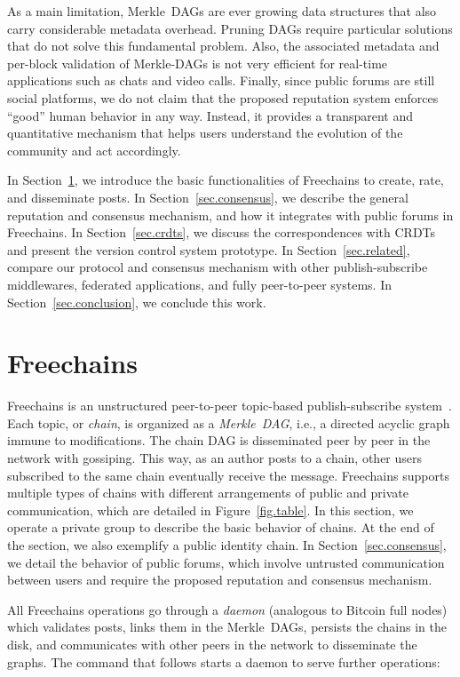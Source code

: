 \documentclass[10pt,journal,compsoc]{IEEEtran}
\newcommand{\FC}       {Freechains\xspace}
\begin{document}
As a main limitation, Merkle~DAGs are ever growing data structures that also
carry considerable metadata overhead.
Pruning DAGs require particular solutions that do not solve this fundamental
problem.
%
Also, the associated metadata and per-block validation of Merkle-DAGs is not
very efficient for real-time applications such as chats and video calls.
%
Finally, since public forums are still social platforms, we do not claim that
the proposed reputation system enforces ``good'' human behavior in any way.
Instead, it provides a transparent and quantitative mechanism that helps users
understand the evolution of the community and act accordingly.

In Section~\ref{sec.freechains}, we introduce the basic functionalities of \FC
to create, rate, and disseminate posts.
In Section~\ref{sec.consensus}, we describe the general reputation and
consensus mechanism, and how it integrates with public forums in \FC.
In Section~\ref{sec.crdts}, we discuss the correspondences with CRDTs and
present the version control system prototype.
In Section~\ref{sec.related}, compare our protocol and consensus mechanism with
other publish-subscribe middlewares, federated applications, and fully
peer-to-peer systems.
In Section~\ref{sec.conclusion}, we conclude this work.

\section{Freechains}
\label{sec.freechains}

\FC is an unstructured peer-to-peer topic-based publish-subscribe
system~\cite{fcs.sbseg20}.
Each topic, or \emph{chain}, is organized as a \emph{Merkle~DAG}, i.e., a
directed acyclic graph immune to modifications.
The chain DAG is disseminated peer by peer in the network with gossiping.
This way, as an author posts to a chain, other users subscribed to the same
chain eventually receive the message.
\FC supports multiple types of chains with different arrangements of public and
private communication, which are detailed in Figure~\ref{fig.table}.
In this section, we operate a private group to describe the basic behavior of
chains.
At the end of the section, we also exemplify a public identity chain.
In Section~\ref{sec.consensus}, we detail the behavior of public forums, which
involve untrusted communication between users and require the proposed
reputation and consensus mechanism.

All \FC operations go through a \emph{daemon} (analogous to Bitcoin full nodes)
which validates posts, links them in the Merkle~DAGs, persists the chains in
the disk, and communicates with other peers in the network to disseminate the
graphs.
The command that follows starts a daemon to serve further operations:
\end{document}
